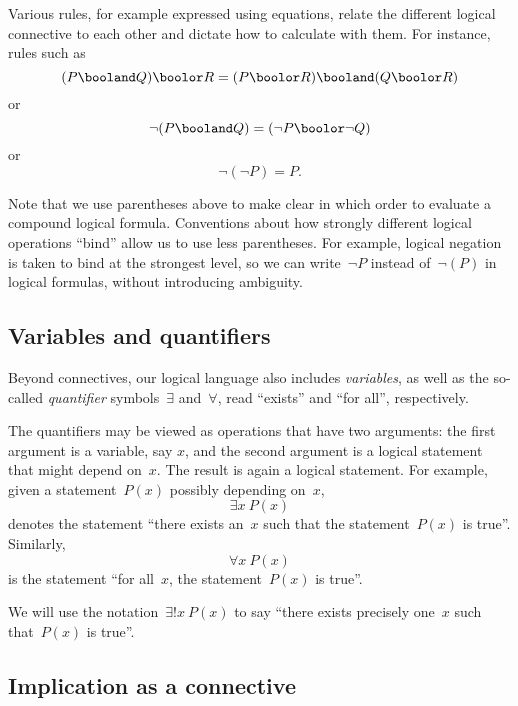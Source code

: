 Various rules, for example expressed using equations, relate the different logical connective to each other and dictate how to calculate with them.
For instance, rules such as
\begin{equation*}
    (P \booland Q) \boolor R = (P \boolor R) \booland (Q \boolor R)
\end{equation*}
or 
\begin{equation*}
     \lnot (P \booland Q)  = (\lnot P \boolor \lnot Q)
\end{equation*}
or 
\begin{equation*}
    \lnot (\lnot P) = P.
\end{equation*}

Note that we use parentheses above to make clear in which order to evaluate a compound logical formula.
Conventions about how strongly different logical operations ``bind'' allow us to use less parentheses.
For example, logical negation is taken to bind at the strongest level, so we can write~$\lnot P$ instead of~$\lnot (P)$ in logical formulas, without introducing ambiguity.

\subsection{Variables and quantifiers}

Beyond connectives, our logical language also includes \emph{variables}, as well as the so-called \emph{quantifier} symbols~$\exists$ and~$\forall$, read ``exists'' and ``for all'', respectively.

The quantifiers may be viewed as operations that have two arguments: the first argument is a variable, say $x$, and the second argument is a logical statement that might depend on~$x$.
The result is again a logical statement.
For example, given a statement~$P(x)$ possibly depending on~$x$,
\begin{equation*}
\exists x \ P(x)
\end{equation*}
denotes the statement ``there exists an~$x$ such that the statement~$P(x)$ is true''.
Similarly,
\begin{equation*}
\forall x \ P(x)
\end{equation*}
is the statement ``for all~$x$, the statement~$P(x)$ is true''.

We will use the notation~$\exists!
    x \ P(x)$ to say ``there exists precisely one~$x$ such that~$P(x)$ is true''.


\subsection{Implication as a connective}

